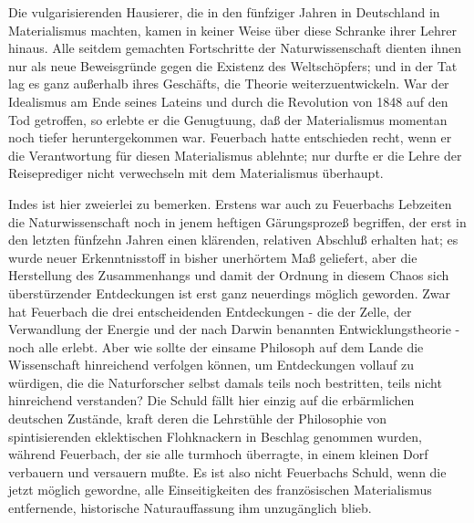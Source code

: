 Die vulgarisierenden Hausierer, die in den fünfziger Jahren in
Deutschland in Materialismus machten, kamen in keiner Weise über diese
Schranke ihrer Lehrer hinaus. Alle seitdem gemachten Fortschritte der
Naturwissenschaft dienten ihnen nur als neue Beweisgründe gegen die
Existenz des Weltschöpfers; und in der Tat lag es ganz außerhalb ihres
Geschäfts, die Theorie weiterzuentwickeln. War der Idealismus am Ende
seines Lateins und durch die Revolution von 1848 auf den Tod getroffen,
so erlebte er die Genugtuung, daß der Materialismus momentan noch tiefer
heruntergekommen war. Feuerbach hatte entschieden recht, wenn er die
Verantwortung für diesen Materialismus ablehnte; nur durfte er die Lehre
der Reiseprediger nicht verwechseln mit dem Materialismus überhaupt.

Indes ist hier zweierlei zu bemerken. Erstens war auch zu
Feuerbachs Lebzeiten die Naturwissenschaft noch in jenem heftigen
Gärungsprozeß begriffen, der erst in den letzten fünfzehn Jahren einen
klärenden, relativen Abschluß erhalten hat; es wurde neuer
Erkenntnisstoff in bisher unerhörtem Maß geliefert, aber die Herstellung
des Zusammenhangs und damit der Ordnung in diesem Chaos sich
überstürzender Entdeckungen ist erst ganz neuerdings möglich geworden.
Zwar hat Feuerbach die drei entscheidenden Entdeckungen - die der Zelle,
der Verwandlung der Energie und der nach Darwin benannten
Entwicklungstheorie - noch alle erlebt. Aber wie sollte der einsame
Philosoph auf dem Lande die Wissenschaft hinreichend verfolgen können,
um Entdeckungen vollauf zu würdigen, die die Naturforscher selbst damals
teils noch bestritten, teils nicht hinreichend verstanden? Die Schuld
fällt hier einzig auf die erbärmlichen deutschen Zustände, kraft deren
die Lehrstühle der Philosophie von spintisierenden eklektischen
Flohknackern in Beschlag genommen wurden, während Feuerbach, der sie
alle turmhoch überragte, in einem kleinen Dorf verbauern und versauern
mußte. Es ist also nicht Feuerbachs Schuld, wenn die jetzt möglich
gewordne, alle Einseitigkeiten des französischen Materialismus
entfernende, historische Naturauffassung ihm unzugänglich blieb.

